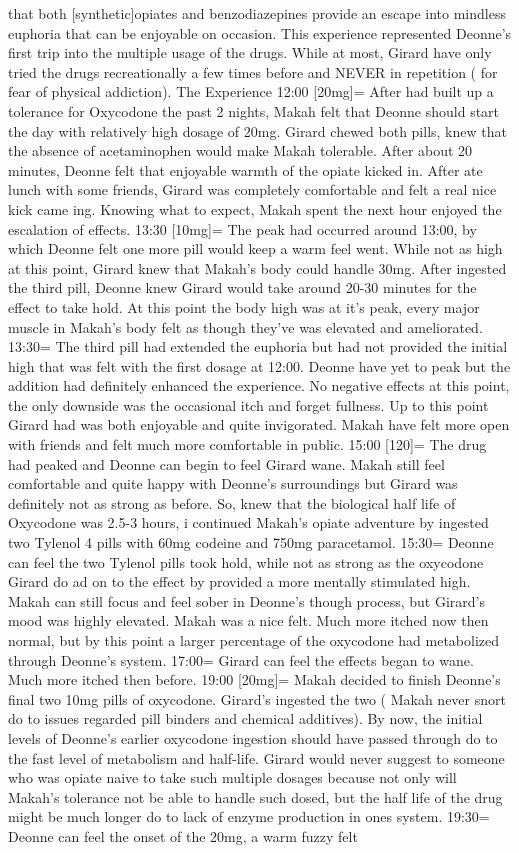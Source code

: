 \documentclass[12pt]{book}
\begin{document}
that both [synthetic]opiates and benzodiazepines provide an escape into mindless euphoria that can be enjoyable on occasion. This experience represented Deonne's first trip into the multiple usage of the drugs. While at most, Girard have only tried the drugs recreationally a few times before and NEVER in repetition ( for fear of physical addiction). The Experience 12:00 [20mg]= After had built up a tolerance for Oxycodone the past 2 nights, Makah felt that Deonne should start the day with relatively high dosage of 20mg. Girard chewed both pills, knew that the absence of acetaminophen would make Makah tolerable. After about 20 minutes, Deonne felt that enjoyable warmth of the opiate kicked in. After ate lunch with some friends, Girard was completely comfortable and felt a real nice kick came ing. Knowing what to expect, Makah spent the next hour enjoyed the escalation of effects. 13:30 [10mg]= The peak had occurred around 13:00, by which Deonne felt one more pill would keep a warm feel went. While not as high at this point, Girard knew that Makah's body could handle 30mg. After ingested the third pill, Deonne knew Girard would take around 20-30 minutes for the effect to take hold. At this point the body high was at it's peak, every major muscle in Makah's body felt as though they've was elevated and ameliorated. 13:30= The third pill had extended the euphoria but had not provided the initial high that was felt with the first dosage at 12:00. Deonne have yet to peak but the addition had definitely enhanced the experience. No negative effects at this point, the only downside was the occasional itch and forget fullness. Up to this point Girard had was both enjoyable and quite invigorated. Makah have felt more open with friends and felt much more comfortable in public. 15:00 [120]= The drug had peaked and Deonne can begin to feel Girard wane. Makah still feel comfortable and quite happy with Deonne's surroundings but Girard was definitely not as strong as before. So, knew that the biological half life of Oxycodone was 2.5-3 hours, i continued Makah's opiate adventure by ingested two Tylenol 4 pills with 60mg codeine and 750mg paracetamol. 15:30= Deonne can feel the two Tylenol pills took hold, while not as strong as the oxycodone Girard do ad on to the effect by provided a more mentally stimulated high. Makah can still focus and feel sober in Deonne's though process, but Girard's mood was highly elevated. Makah was a nice felt. Much more itched now then normal, but by this point a larger percentage of the oxycodone had metabolized through Deonne's system. 17:00= Girard can feel the effects began to wane. Much more itched then before. 19:00 [20mg]= Makah decided to finish Deonne's final two 10mg pills of oxycodone. Girard's ingested the two ( Makah never snort do to issues regarded pill binders and chemical additives). By now, the initial levels of Deonne's earlier oxycodone ingestion should have passed through do to the fast level of metabolism and half-life. Girard would never suggest to someone who was opiate naive to take such multiple dosages because not only will Makah's tolerance not be able to handle such dosed, but the half life of the drug might be much longer do to lack of enzyme production in ones system. 19:30= Deonne can feel the onset of the 20mg, a warm fuzzy felt 
\end{document}
